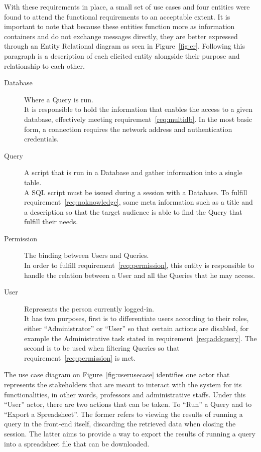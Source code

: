 With these requirements in place, a small set of use cases and four entities were found to attend the functional requirements to an acceptable extent.
It is important to note that because these entities function more as information containers and do not exchange messages directly, they are better expressed through an Entity Relational diagram as seen in Figure~\ref{fig:er}.
Following this paragraph is a description of each elicited entity alongside their purpose and relationship to each other.

\begin{description}
\item[Database] Where a Query is run.\\
  It is responsible to hold the information that enables the access to a given database, effectively meeting requirement~\ref{req:multidb}.
  In the most basic form, a connection requires the network address and authentication credentials.
\item[Query] A script that is run in a Database and gather information into a single table.\label{model:query}\\
  A \gls{SQL} script must be issued during a session with a Database.
  To fulfill requirement~\ref{req:noknowledge}, some meta information such as a title and a description so that the target audience is able to find the Query that fulfill their needs.
\item[Permission] The binding between Users and Queries.\\
  In order to fulfill requirement~\ref{req:permission}, this entity is responsible to handle the relation between a User and all the Queries that he may access.
\item[User] Represents the person currently logged-in.\\
  It has two purposes, first is to differentiate users according to their roles, either ``Administrator'' or ``User'' so that certain actions are disabled, for example the Administrative task stated in requirement~\ref{req:addquery}.
  The second is to be used when filtering Queries so that requirement~\ref{req:permission} is met.
\end{description}

The use case diagram on Figure~\ref{fig:userusecase} identifies one actor that represents the stakeholders that are meant to interact with the system for its functionalities, in other words,  professors and administrative staffs. Under this ``User'' actor, there are two actions that can be taken. To ``Run'' a Query and to ``Export a Spreadsheet''. The former refers to viewing the results of running a query in the front-end itself, discarding the retrieved data when closing the session. The latter aims to provide a way to export the results of running a query into a spreadsheet file that can be downloaded.

